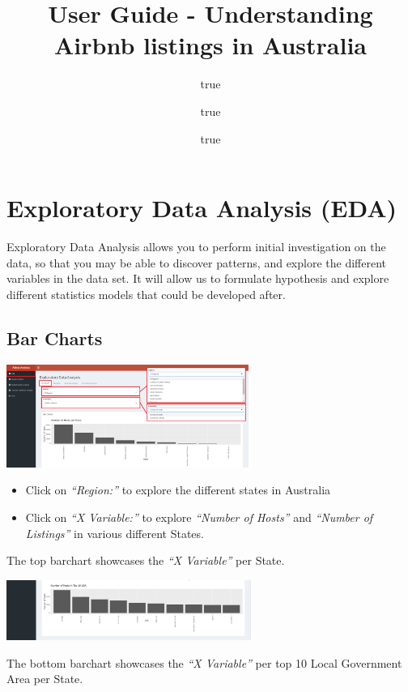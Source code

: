 \documentclass[
]{article}
\title{User Guide - Understanding Airbnb listings in Australia}
\author{true \and true \and true}
\date{}
\providecommand{\tightlist}{%
  \setlength{\itemsep}{0pt}\setlength{\parskip}{0pt}}
\begin{document}
\maketitle

\hypertarget{exploratory-data-analysis-eda}{%
\section{Exploratory Data Analysis
(EDA)}\label{exploratory-data-analysis-eda}}

Exploratory Data Analysis allows you to perform initial investigation on
the data, so that you may be able to discover patterns, and explore the
different variables in the data set. It will allow us to formulate
hypothesis and explore different statistics models that could be
developed after.

\hypertarget{bar-charts}{%
\subsection{Bar Charts}\label{bar-charts}}

\includegraphics[width=0.6\textwidth,height=\textheight]{images/edabar.png}

\begin{itemize}
\tightlist
\item
  Click on \emph{``Region:''} to explore the different states in
  Australia
\item
  Click on \emph{``X Variable:''} to explore \emph{``Number of Hosts''}
  and \emph{``Number of Listings''} in various different States.
\end{itemize}

The top barchart showcases the \emph{``X Variable''} per State.

\includegraphics[width=0.6\textwidth,height=\textheight]{images/edabar2.png}

The bottom barchart showcases the \emph{``X Variable''} per top 10 Local
Government Area per State.
\end{document}
